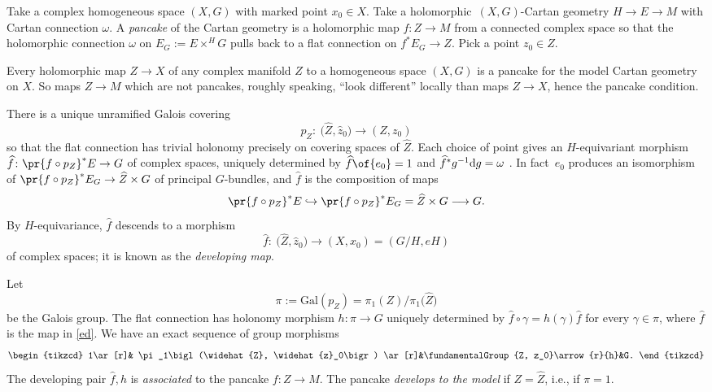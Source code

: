 \documentclass[pdftex]{sigma}
\numberwithin{equation}{section}
\newcommand{\amal}[3]{\ensuremath{{#1} \mathbin{\times^{#2}} \! #3}}
\begin{document}
Take a complex homogeneous space $(X, G)$ with marked point $x_0 \in X$.
Take a holomorphic~$(X, G)$-Cartan geometry $H \longrightarrow
E \to M$ with Cartan connection $\omega$.
A \emph{pancake} of the Cartan geometry is a holomorphic map $f \colon Z \longrightarrow
 M$ from a connected complex space so that the holomorphic connection $\omega$ on $E_G := \amal{E}{H}{G}$ pulls back to a flat
connection on $f^* E_G \to Z$. Pick a point $z_0 \in Z$.
\begin{Example}
Every holomorphic map $Z\to X$ of any complex manifold $Z$ to a homogeneous space $(X,G)$ is a pancake for the model Cartan geometry on $X$.
So maps $Z\to M$ which are not pancakes, roughly speaking, ``look different'' locally than maps $Z\to X$, hence the pancake condition.
\end{Example}
There is a unique unramified Galois covering
\[
p_Z \colon \ \big(\widehat{Z}, \widehat{z}_0\big) \to (Z, z_0)
\]
so that the flat connection has trivial holonomy precisely on covering spaces of $\widehat{Z}$.
Each choice of point  gives an $H$-equivariant morphism $\widehat{f} \colon
 \pr{f \circ p_Z}^*E \to G$ of complex spaces, uniquely determined by
$
\widehat{f}\of{e_0} = 1
$
and $\widehat{f}^* g^{-1} {\rm d}g = \omega$ \cite[Section 2.3]{Biswas.McKay:2016}. In fact~$e_0$ produces an
isomorphism of $\pr{f \circ p_Z}^*E_G \to \widehat{Z}\times G$ of principal $G$-bundles, and
$\widehat{f}$ is the composition of maps
\[
\pr{f \circ p_Z}^*E \hookrightarrow \pr{f \circ p_Z}^*E_G = \widehat{Z}\times G \longrightarrow G.
\]
By $H$-equivariance, $\widehat{f}$ descends to a morphism
\begin{equation}\label{ed}
\widehat{f} \colon \ \big(\widehat{Z}, \widehat{z}_0\big)
\to (X, x_0) = (G/H, eH)
\end{equation}
of complex spaces; it is known as the \emph{developing map}.

Let
\[
\pi := \text{Gal}(p_Z) = \pi_1(Z)/\pi_1\bigl(\widehat Z\bigr)
\]
be the Galois group. The flat connection has holonomy morphism
$
h \colon \pi \to G
$
uniquely determined by $\widehat{f}\circ\gamma = h(\gamma)\widehat{f}$ for every $\gamma \in \pi$, where $\widehat{f}$ is the map in \eqref{ed}.
We have an exact sequence of group morphisms
\[
\begin{tikzcd}
1\ar[r]& \pi_1\bigl(\widehat{Z}, \widehat{z}_0\bigr) \ar[r]&\fundamentalGroup{Z, z_0}\arrow{r}{h}&G.
\end{tikzcd}
\]
The developing pair $\widehat{f}, h$ is \emph{associated} to the pancake $f \colon Z \to M$.
The pancake \emph{develops to the model} if $Z = \widehat{Z}$, i.e., if $\pi = 1$.
\end{document}
